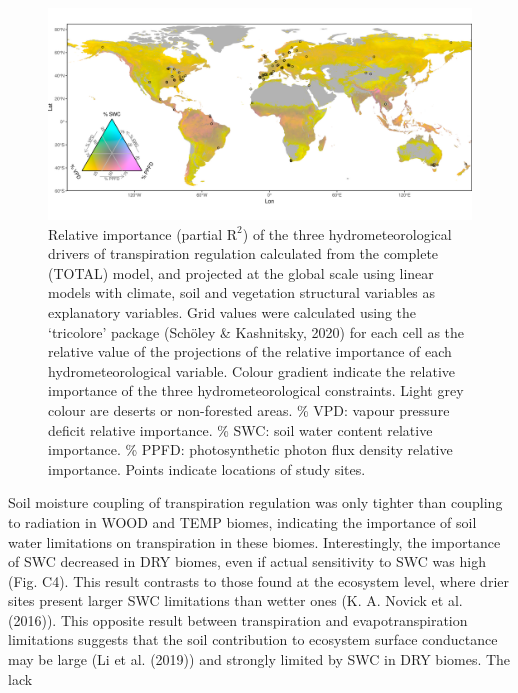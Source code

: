 \documentclass[11pt,twoside]{reedthesis}
\begin{document}
\begin{figure}[hbt!]

{\centering \includegraphics[width=1\linewidth]{figure/CH4/Figure3} 

}

\caption[Relative importance (partial $\text{R}^2$) of the three hydrometeorological drivers of transpiration regulation.]{Relative importance (partial \(\text{R}^2\)) of the three
hydrometeorological drivers of transpiration regulation calculated from
the complete (TOTAL) model, and projected at the global scale using
linear models with climate, soil and vegetation structural variables as
explanatory variables. Grid values were calculated using the `tricolore'
package (Schöley \& Kashnitsky, 2020) for each cell as the relative
value of the projections of the relative importance of each
hydrometeorological variable. Colour gradient indicate the relative
importance of the three hydrometeorological constraints. Light grey
colour are deserts or non-forested areas. \% VPD: vapour pressure
deficit relative importance. \% SWC: soil water content relative
importance. \% PPFD: photosynthetic photon flux density relative
importance. Points indicate locations of study sites.}\label{fig:ch4fig3}
\end{figure}
Soil moisture coupling of transpiration regulation was only tighter than
coupling to radiation in WOOD and TEMP biomes, indicating the importance
of soil water limitations on transpiration in these biomes.
Interestingly, the importance of SWC decreased in DRY biomes, even if
actual sensitivity to SWC was high (Fig. C4). This result contrasts to
those found at the ecosystem level, where drier sites present larger SWC
limitations than wetter ones (K. A. Novick et al. (2016)). This opposite
result between transpiration and evapotranspiration limitations suggests
that the soil contribution to ecosystem surface conductance may be large
(Li et al. (2019)) and strongly limited by SWC in DRY biomes. The lack
\end{document}
